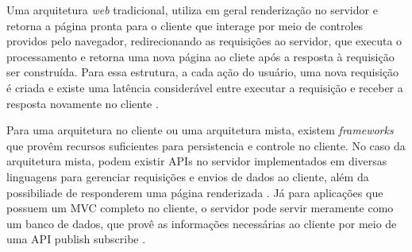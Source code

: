 Uma arquitetura \textit{web} tradicional, utiliza em geral renderização no servidor e retorna a página pronta para o cliente que interage por meio de controles providos pelo navegador, redirecionando as requisições ao servidor, que executa o processamento e retorna uma nova página ao cliete após a resposta à requisição ser construída. Para essa estrutura, a cada ação do usuário, uma nova requisição é criada e existe uma latência considerável entre executar a requisição e receber a resposta novamente no cliente \cite{mejia2011}.

Para uma arquitetura no cliente ou uma arquitetura mista, existem \textit{frameworks} que provêm recursos suficientes para persistencia e controle no cliente. No caso da arquitetura mista, podem existir APIs no servidor implementados em diversas linguagens para gerenciar requisições e envios de dados ao cliente, além da possibiliade de responderem uma página renderizada \cite{ petitit2014, quinn2015}. Já para aplicações que possuem um MVC completo no cliente, o servidor pode servir meramente como um banco de dados, que provê as informações necessárias ao cliente por meio de uma API publish subscribe \cite{quinn2015}.

